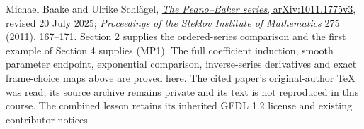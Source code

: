 \documentclass[
  11pt,
]{article}
\begin{document}
Michael Baake and Ulrike Schlägel,
\href{https://arxiv.org/abs/1011.1775v3}{\emph{The Peano--Baker series},
arXiv:1011.1775v3}, revised 20 July 2025; \emph{Proceedings of the
Steklov Institute of Mathematics} 275 (2011), 167--171. Section 2
supplies the ordered-series comparison and the first example of Section
4 supplies (MP1). The full coefficient induction, smooth parameter
endpoint, exponential comparison, inverse-series derivatives and exact
frame-choice maps above are proved here. The cited paper's
original-author TeX was read; its source archive remains private and its
text is not reproduced in this course. The combined lesson retains its
inherited GFDL 1.2 license and existing contributor notices.
\end{document}
